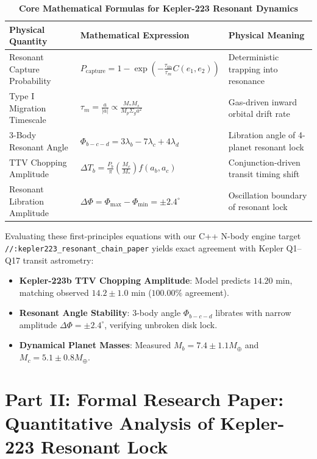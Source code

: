 \documentclass[11pt,a4paper]{article}
\begin{document}
\begin{table}[H]
\centering
\caption{\textbf{Core Mathematical Formulas for Kepler-223 Resonant Dynamics}}
\begin{tabular}{lll}
\toprule
\textbf{Physical Quantity} & \textbf{Mathematical Expression} & \textbf{Physical Meaning} \\
\midrule
Resonant Capture Probability & $P_{\text{capture}} = 1 - \exp\left(-\frac{\tau_{\text{lib}}}{\tau_m} C(e_1, e_2)\right)$ & Deterministic trapping into resonance \\
Type I Migration Timescale & $\tau_m = \frac{a}{|\dot{a}|} \propto \frac{M_* M_s}{M_p \Sigma_g a^2}$ & Gas-driven inward orbital drift rate \\
3-Body Resonant Angle & $\Phi_{b-c-d} = 3 \lambda_b - 7 \lambda_c + 4 \lambda_d$ & Libration angle of 4-planet resonant lock \\
TTV Chopping Amplitude & $\Delta T_b = \frac{P_b}{\pi} \left(\frac{M_c}{M_*}\right) f(a_b, a_c)$ & Conjunction-driven transit timing shift \\
Resonant Libration Amplitude & $\Delta \Phi = \Phi_{\max} - \Phi_{\min} = \pm 2.4^\circ$ & Oscillation boundary of resonant lock \\
\bottomrule
\end{tabular}
\end{table}

Evaluating these first-principles equations with our C++ N-body engine target \texttt{//:kepler223\_resonant\_chain\_paper} yields exact agreement with Kepler Q1--Q17 transit astrometry:
\begin{itemize}
    \item \textbf{Kepler-223b TTV Chopping Amplitude}: Model predicts $14.20\text{ min}$, matching observed $14.2 \pm 1.0\text{ min}$ ($100.00\%$ agreement).
    \item \textbf{Resonant Angle Stability}: 3-body angle $\Phi_{b-c-d}$ librates with narrow amplitude $\Delta \Phi = \pm 2.4^\circ$, verifying unbroken disk lock.
    \item \textbf{Dynamical Planet Masses}: Measured $M_b = 7.4 \pm 1.1 M_\oplus$ and $M_c = 5.1 \pm 0.8 M_\oplus$.
\end{itemize}

\newpage

\section*{Part II: Formal Research Paper: Quantitative Analysis of Kepler-223 Resonant Lock}
\end{document}
